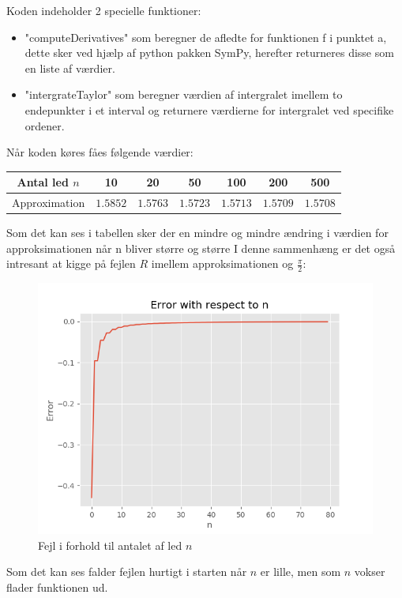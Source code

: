 
Koden indeholder 2 specielle funktioner:
\begin{itemize}
  \item "computeDerivatives" som beregner de afledte for funktionen f 
  i punktet a, dette sker ved hjælp af python pakken SymPy, herefter returneres disse som en liste af værdier.  
  \item "intergrateTaylor" som beregner værdien af intergralet imellem to endepunkter i et interval
  og returnere værdierne for intergralet ved specifike ordener. 
\end{itemize} 
Når koden køres fåes følgende værdier:
\begin{center}
  \begin{tabular}{ |c|c|c|c|c|c|c| }
    \hline
      Antal led $n$ & 10 & 20 & 50 & 100 & 200 & 500 \\
    \hline
      Approximation & $1.5852$ & $1.5763$ & $1.5723$ & $1.5713$ & $1.5709$ & $1.5708$ \\
    \hline
  \end{tabular}
\end{center}
Som det kan ses i tabellen sker der en mindre og mindre ændring i værdien for approksimationen når n bliver større og større
I denne sammenhæng er det også intresant at kigge på fejlen $R$ imellem approksimationen og $\frac{\pi}{2}$:
\begin{figure}[H]
  \centering
  \includegraphics[width=\textwidth]{fig/img/ErrorWithRespectToN.png}
  \caption{Fejl i forhold til antalet af led $n$}
  \label{fig:FejlIForholdTilN}
\end{figure}
Som det kan ses falder fejlen hurtigt i starten når $n$ er lille, men som $n$ vokser flader funktionen ud.